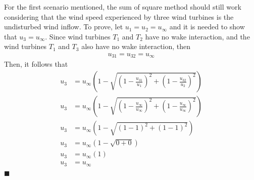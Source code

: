     For the first scenario mentioned, the sum of square method should still work considering that the wind speed experienced by three wind turbines is the undisturbed wind inflow. To prove, let $u_1=u_2=u_\infty$ and it is needed to show that $u_3=u_\infty$. Since wind turbines $T_1$ and $T_2$ have no wake interaction, and the wind turbines $T_1$ and $T_3$ also have no wake interaction, then
    \begin{align*}
        u_{31}=u_{32}=u_\infty
    \end{align*}
    Then, it follows that
    \begin{align*}
        u_3 &= u_\infty\left( 1-\sqrt{\left( 1-\frac{u_{31}}{u_1} \right)^2 + \left( 1-\frac{u_{32}}{u_2} \right)^2} \right) \\
        u_3 &= u_\infty\left( 1-\sqrt{\left( 1-\frac{u_\infty}{u_\infty} \right)^2 + \left( 1-\frac{u_\infty}{u_\infty} \right)^2} \right) \\
        u_3 &= u_\infty\left( 1-\sqrt{\left( 1-1 \right)^2 + \left( 1-1 \right)^2} \right) \\
        u_3 &= u_\infty\left( 1-\sqrt{0 + 0} \right) \\
        u_3 &= u_\infty\left( 1 \right) \\
        u_3 &= u_\infty
    \end{align*} \hfill $\blacksquare$
    
